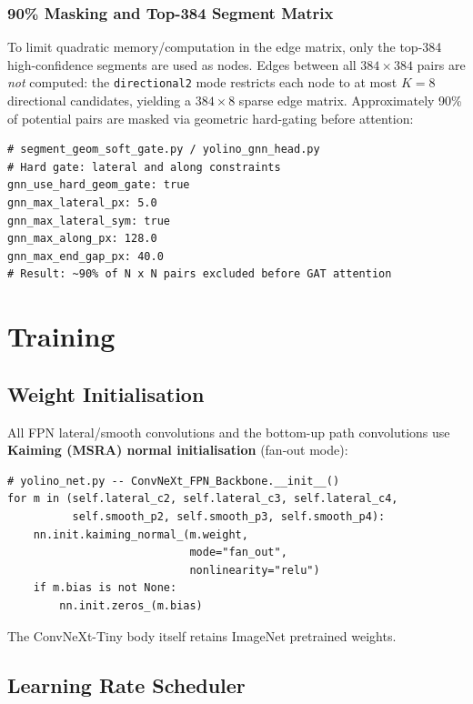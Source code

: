 \documentclass[11pt,a4paper]{article}
\begin{document}
\subsubsection{90\% Masking and Top-384 Segment Matrix}

To limit quadratic memory/computation in the edge matrix, only the top-384
high-confidence segments are used as nodes. Edges between all $384 \times 384$
pairs are \emph{not} computed: the \texttt{directional2} mode restricts each node
to at most $K=8$ directional candidates, yielding a $384 \times 8$ sparse
edge matrix. Approximately 90\% of potential pairs are masked via geometric
hard-gating before attention:

\begin{lstlisting}
# segment_geom_soft_gate.py / yolino_gnn_head.py
# Hard gate: lateral and along constraints
gnn_use_hard_geom_gate: true
gnn_max_lateral_px: 5.0
gnn_max_lateral_sym: true
gnn_max_along_px: 128.0
gnn_max_end_gap_px: 40.0
# Result: ~90% of N x N pairs excluded before GAT attention
\end{lstlisting}

\section{Training}
\label{sec:training}

\subsection{Weight Initialisation}
\label{subsec:init}

All FPN lateral/smooth convolutions and the bottom-up path convolutions
use \textbf{Kaiming (MSRA) normal initialisation} (fan-out mode):

\begin{lstlisting}
# yolino_net.py -- ConvNeXt_FPN_Backbone.__init__()
for m in (self.lateral_c2, self.lateral_c3, self.lateral_c4,
          self.smooth_p2, self.smooth_p3, self.smooth_p4):
    nn.init.kaiming_normal_(m.weight,
                            mode="fan_out",
                            nonlinearity="relu")
    if m.bias is not None:
        nn.init.zeros_(m.bias)
\end{lstlisting}

The ConvNeXt-Tiny body itself retains ImageNet pretrained weights.

\subsection{Learning Rate Scheduler}
\label{subsec:scheduler}
\end{document}
